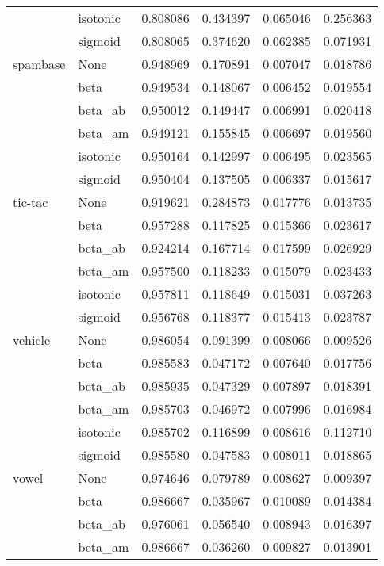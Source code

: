 \begin{tabular}{llrrrr}
        & isotonic &  0.808086 &  0.434397 &  0.065046 &  0.256363 \\
        & sigmoid &  0.808065 &  0.374620 &  0.062385 &  0.071931 \\
spambase & None &  0.948969 &  0.170891 &  0.007047 &  0.018786 \\
        & beta &  0.949534 &  0.148067 &  0.006452 &  0.019554 \\
        & beta\_ab &  0.950012 &  0.149447 &  0.006991 &  0.020418 \\
        & beta\_am &  0.949121 &  0.155845 &  0.006697 &  0.019560 \\
        & isotonic &  0.950164 &  0.142997 &  0.006495 &  0.023565 \\
        & sigmoid &  0.950404 &  0.137505 &  0.006337 &  0.015617 \\
tic-tac & None &  0.919621 &  0.284873 &  0.017776 &  0.013735 \\
        & beta &  0.957288 &  0.117825 &  0.015366 &  0.023617 \\
        & beta\_ab &  0.924214 &  0.167714 &  0.017599 &  0.026929 \\
        & beta\_am &  0.957500 &  0.118233 &  0.015079 &  0.023433 \\
        & isotonic &  0.957811 &  0.118649 &  0.015031 &  0.037263 \\
        & sigmoid &  0.956768 &  0.118377 &  0.015413 &  0.023787 \\
vehicle & None &  0.986054 &  0.091399 &  0.008066 &  0.009526 \\
        & beta &  0.985583 &  0.047172 &  0.007640 &  0.017756 \\
        & beta\_ab &  0.985935 &  0.047329 &  0.007897 &  0.018391 \\
        & beta\_am &  0.985703 &  0.046972 &  0.007996 &  0.016984 \\
        & isotonic &  0.985702 &  0.116899 &  0.008616 &  0.112710 \\
        & sigmoid &  0.985580 &  0.047583 &  0.008011 &  0.018865 \\
vowel & None &  0.974646 &  0.079789 &  0.008627 &  0.009397 \\
        & beta &  0.986667 &  0.035967 &  0.010089 &  0.014384 \\
        & beta\_ab &  0.976061 &  0.056540 &  0.008943 &  0.016397 \\
        & beta\_am &  0.986667 &  0.036260 &  0.009827 &  0.013901 \\

\end{tabular}
